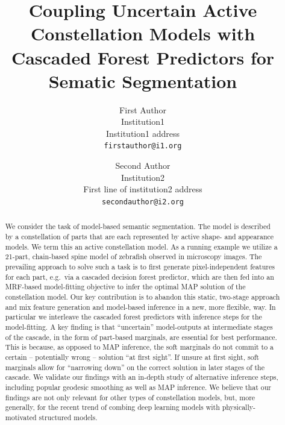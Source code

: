 \documentclass[10pt,twocolumn,letterpaper]{article}
\begin{document}
\title{Coupling Uncertain Active Constellation Models with \\
Cascaded Forest Predictors for Sematic Segmentation}

\author{First Author\\
Institution1\\
Institution1 address\\
{\tt\small firstauthor@i1.org}
\and
Second Author\\
Institution2\\
First line of institution2 address\\
{\tt\small secondauthor@i2.org}
}

\maketitle

\begin{abstract}
We consider the task of model-based semantic segmentation. The model is described by a constellation of parts that are each represented by active shape- and appearance models. We term this an active constellation model. As a running example we utilize a 21-part, chain-based spine model of zebrafish observed in microscopy images. The prevailing approach to solve such a task is to first generate pixel-independent features for each part, e.g.\ via a cascaded decision forest predictor, which are then fed into an MRF-based model-fitting objective to infer the optimal MAP solution of the constellation model. Our key contribution is to abandon this static, two-stage approach and mix feature generation and model-based inference in a new, more flexible, way. In particular we interleave the cascaded forest predictors with inference steps for the model-fitting. A key finding is that “uncertain” model-outputs at intermediate stages of the cascade, in the form of part-based marginals, are essential for best performance. 
%
This is because, as opposed to MAP inference, the soft marginals do not commit to a certain -- potentially wrong -- solution ``at first sight''. If unsure at first sight, soft marginals allow for ``narrowing down'' on the correct solution in later stages of the cascade. 
%
We validate our findings with an in-depth study of alternative inference steps, including popular geodesic smoothing as well as MAP inference. %
We believe that our findings are not only relevant for other types of constellation models, but, more generally, for the recent trend of combing deep learning models with physically-motivated structured models. 
\end{abstract}
\end{document}
